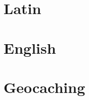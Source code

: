 \documentclass[oneside,12pt,headlines=1.5]{scrreprt}
\begin{document}
\maketitle

\section*{Latin}
\selectlanguage{\latin}
\blindtext 

\section*{English}
\selectlanguage{\english}
\blindtext 

\section*{Geocaching}
\selectlanguage{\ngerman}
\blindtext 
\end{document}
